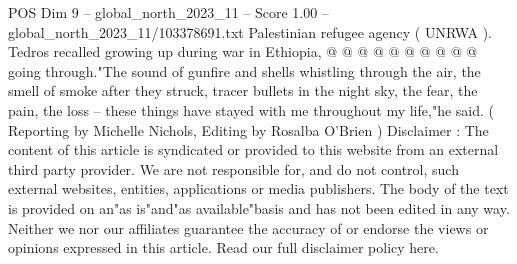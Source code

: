 \begin{textsample}{POS Dim 9 – global\_north\_2023\_11 – Score 1.00 – global\_north\_2023\_11/103378691.txt}
Palestinian refugee agency ( UNRWA ).
Tedros recalled growing up during war in Ethiopia, @ @ @ @ @ @ @ @ @ @ going through."The sound of gunfire and shells whistling through the air, the smell of smoke after they struck, tracer bullets in the night sky, the fear, the pain, the loss -- these things have stayed with me throughout my life,"he said. ( Reporting by Michelle Nichols, Editing by Rosalba O'Brien ) Disclaimer : The content of this article is syndicated or provided to this website from an external third party provider.
We are not responsible for, and do not control, such external websites, entities, applications or media publishers.
The body of the text is provided on an"as is"and"as available"basis and has not been edited in any way.
Neither we nor our affiliates guarantee the accuracy of or endorse the views or opinions expressed in this article.
Read our full disclaimer policy here.

\end{textsample}

